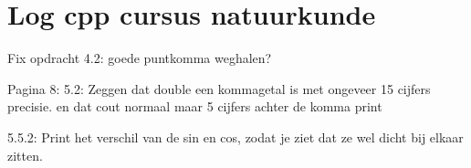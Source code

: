 \documentclass[12pt,a4paper]{article}
\begin{document}
\section*{Log cpp cursus natuurkunde}
Fix opdracht 4.2: goede puntkomma weghalen?

Pagina 8: 5.2: Zeggen dat double een kommagetal is met ongeveer 15 cijfers precisie.
en dat cout normaal maar 5 cijfers achter de komma print

5.5.2: Print het verschil van de sin en cos, zodat je ziet dat ze wel dicht bij elkaar zitten.
\end{document}
